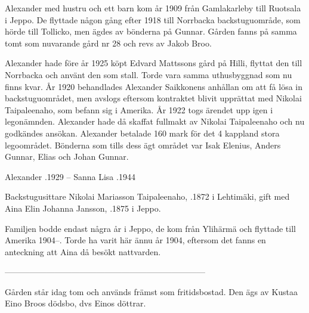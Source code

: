 Alexander med hustru och ett barn kom år 1909 från Gamlakarleby till Ruotsala i Jeppo. De flyttade någon gång efter 1918 till Norrbacka backstuguområde, som hörde till Tollicko, men ägdes av bönderna på Gunnar. Gården fanns på samma tomt som nuvarande gård nr 28 och revs av Jakob Broo.

Alexander hade före år 1925 köpt Edvard Mattssons gård på Hilli, flyttat den till Norrbacka och använt den som stall. Torde vara samma uthusbyggnad som nu finns kvar. År 1920 behandlades Alexander Saikkonens anhållan om att få lösa in backstuguområdet, men avslogs eftersom kontraktet blivit upprättat med Nikolai Taipaleenaho, som befann sig i Amerika. År 1922 togs ärendet upp igen i legonämnden. Alexander hade då skaffat fullmakt av Nikolai Taipaleenaho och nu godkändes ansökan. Alexander betalade 160 mark för det 4 kappland stora legoområdet. Bönderna som tills dess ägt området var Isak Elenius, Anders Gunnar, Elias och Johan Gunnar.

Alexander .1929  --  Sanna Lisa .1944


Backstugusittare Nikolai Mariasson Taipaleenaho, .1872 i Lehtimäki, gift med Aina Elin Johanna Jansson, .1875 i Jeppo.

\begin{jhchildren}
  \item {}
  \item {}
  \item {}
\end{jhchildren}

Familjen bodde endast några år i Jeppo, de kom från Ylihärmä och flyttade till Amerika 1904--. Torde ha varit här ännu år 1904, eftersom det fanns en anteckning att Aina då besökt nattvarden.


------------------------------------------------------------------------






Gården står idag tom och används främst som fritidsbostad. Den ägs av Kustaa Eino Broos dödsbo, dvs Einos döttrar.\jhvspace{}



